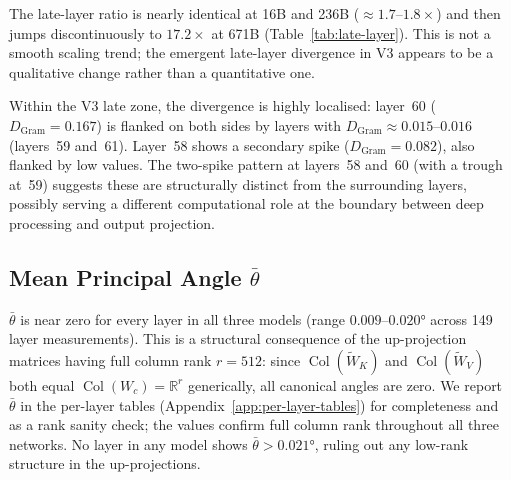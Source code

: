 The late-layer ratio is nearly identical at 16B and 236B ($\approx 1.7$--$1.8\times$)
and then jumps discontinuously to $17.2\times$ at 671B (Table~\ref{tab:late-layer}).
This is not a smooth scaling trend; the emergent late-layer divergence in V3
appears to be a qualitative change rather than a quantitative one.

Within the V3 late zone, the divergence is highly localised:
layer~60 ($D_\text{Gram} = 0.167$) is flanked on both sides by layers with
$D_\text{Gram} \approx 0.015$--$0.016$ (layers~59 and~61).
Layer~58 shows a secondary spike ($D_\text{Gram} = 0.082$), also flanked by
low values.
The two-spike pattern at layers~58 and~60 (with a trough at~59) suggests
these are structurally distinct from the surrounding layers, possibly serving
a different computational role at the boundary between deep processing and
output projection.

\subsection{Mean Principal Angle $\bar\theta$}
\label{app:theta}

$\bar\theta$ is near zero for every layer in all three models
(range $0.009$--$0.020°$ across 149 layer measurements).
This is a structural consequence of the up-projection matrices having full
column rank $r = 512$: since $\operatorname{Col}(\widetilde{W}_K)$ and
$\operatorname{Col}(\widetilde{W}_V)$ both equal $\operatorname{Col}(W_c) =
\mathbb{R}^r$ generically, all canonical angles are zero.
We report $\bar\theta$ in the per-layer tables (Appendix~\ref{app:per-layer-tables})
for completeness and as a rank sanity check; the values confirm full column rank
throughout all three networks.
No layer in any model shows $\bar\theta > 0.021°$, ruling out any low-rank
structure in the up-projections.
